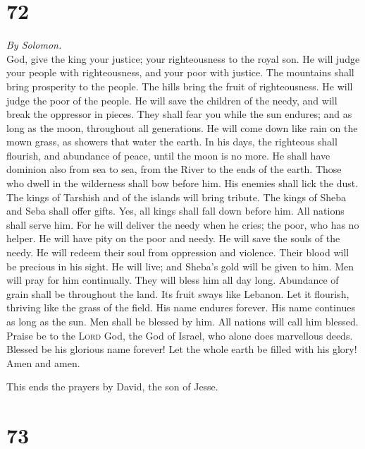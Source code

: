 \hypertarget{section-71}{%
\section{72}\label{section-71}}

\emph{By Solomon.}\\
 God, give the king your justice; your righteousness to
the royal son.  He will judge your people with
righteousness, and your poor with justice.  The mountains
shall bring prosperity to the people. The hills bring the fruit of
righteousness.  He will judge the poor of the people. He
will save the children of the needy, and will break the oppressor in
pieces.  They shall fear you while the sun endures; and as
long as the moon, throughout all generations.  He will
come down like rain on the mown grass, as showers that water the earth.
 In his days, the righteous shall flourish, and abundance
of peace, until the moon is no more.  He shall have
dominion also from sea to sea, from the River to the ends of the earth.
 Those who dwell in the wilderness shall bow before him.
His enemies shall lick the dust.  The kings of Tarshish
and of the islands will bring tribute. The kings of Sheba and Seba shall
offer gifts.  Yes, all kings shall fall down before him.
All nations shall serve him.  For he will deliver the
needy when he cries; the poor, who has no helper.  He
will have pity on the poor and needy. He will save the souls of the
needy.  He will redeem their soul from oppression and
violence. Their blood will be precious in his sight.  He
will live; and Sheba's gold will be given to him. Men will pray for him
continually. They will bless him all day long.  Abundance
of grain shall be throughout the land. Its fruit sways like Lebanon. Let
it flourish, thriving like the grass of the field.  His
name endures forever. His name continues as long as the sun. Men shall
be blessed by him. All nations will call him blessed. 
Praise be to the \textsc{Lord} God, the God of Israel, who alone does
marvellous deeds.  Blessed be his glorious name forever!
Let the whole earth be filled with his glory! Amen and amen.

 This ends the prayers by David, the son of Jesse.

\hypertarget{section-72}{%
\section{73}\label{section-72}}


